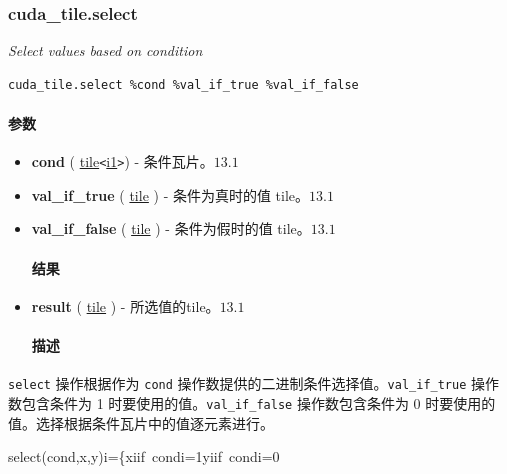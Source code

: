 \documentclass{article}
\begin{document}
\subsubsection{cuda\_tile.select}

\textit{Select values based on condition}


\begin{lstlisting}
cuda_tile.select %cond %val_if_true %val_if_false
\end{lstlisting}

\paragraph{参数}

\begin{itemize}
\item \textbf{cond} ( \href{https://docs.nvidia.com/cuda/tile-ir/latest/sections/types.html#type-tile}{tile}\texttt{<}\href{https://docs.nvidia.com/cuda/tile-ir/latest/sections/types.html#subsection-element-types}{i1}\texttt{>}) - 条件瓦片。$\boxed{13.1}$
\item \textbf{val\_if\_true} ( \href{https://docs.nvidia.com/cuda/tile-ir/latest/sections/types.html#type-tile}{tile} ) - 条件为真时的值 tile。$\boxed{13.1}$
\item \textbf{val\_if\_false} ( \href{https://docs.nvidia.com/cuda/tile-ir/latest/sections/types.html#type-tile}{tile} ) - 条件为假时的值 tile。$\boxed{13.1}$


\paragraph{结果}

\item \textbf{result} ( \href{https://docs.nvidia.com/cuda/tile-ir/latest/sections/types.html#type-tile}{tile} ) - 所选值的tile。$\boxed{13.1}$


\paragraph{描述}

\end{itemize}
\texttt{select} 操作根据作为 \texttt{cond} 操作数提供的二进制条件选择值。\texttt{val\_if\_true} 操作数包含条件为 1 时要使用的值。\texttt{val\_if\_false} 操作数包含条件为 0 时要使用的值。选择根据条件瓦片中的值逐元素进行。


select(cond,x,y)i=\{xiif condi=1yiif condi=0
\end{document}
